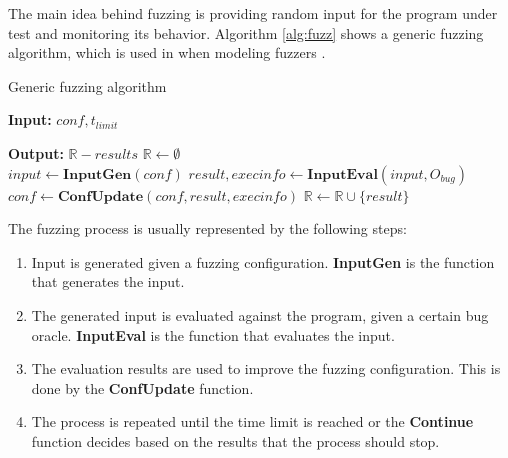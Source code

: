 The main idea behind fuzzing is providing random input for the program under test and monitoring its behavior.
Algorithm \ref{alg:fuzz} shows a generic fuzzing algorithm, which is used in when modeling fuzzers \cite{manes_art_2019}.

\begin{algorithm}[H]
    \caption{Generic fuzzing algorithm}\label{alg:fuzz}
    \begin{algorithmic}
        \item \textbf{Input: } $conf, t_{limit}$
        \item \textbf{Output: } $\mathbb{R} - results$
        \State $\mathbb{R} \gets \emptyset$
        \\
        \State $input \gets \textbf{InputGen}(conf)$
        \State $result, execinfo \gets \textbf{InputEval}(input, O_{bug})$
        \State $conf \gets \textbf{ConfUpdate}(conf, result, execinfo)$
        \State $\mathbb{R} \gets \mathbb{R} \cup \{result\}$
        \EndWhile
    \end{algorithmic}
\end{algorithm}

The fuzzing process is usually represented by the following steps:
\begin{enumerate}
    \item Input is generated given a fuzzing configuration.
          \textbf{InputGen} is the function that generates the input.
    \item The generated input is evaluated against the program, given a certain bug oracle.
          \textbf{InputEval} is the function that evaluates the input.
    \item The evaluation results are used to improve the fuzzing configuration.
          This is done by the \textbf{ConfUpdate} function.
    \item The process is repeated until the time limit is reached or the \textbf{Continue} function decides based on the results that the process should stop.
\end{enumerate}


